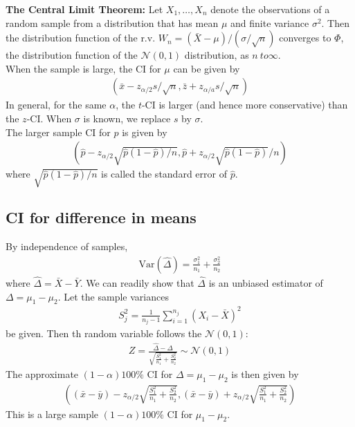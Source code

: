\documentclass{book}
\theoremstyle{definition}
\newcommand{\N}{\mathcal{N}}
\newcommand{\f}[2]{\frac{#1}{#2}}
\newcommand{\lp}{\left(}
\newcommand{\rp}{\right)}
\begin{document}
\noindent \textbf{The Central Limit Theorem:} Let $X_1,\dots,X_n$ denote the observations of a random sample from a distribution that has mean $\mu$ and finite variance $\sigma^2$. Then the distribution function of the r.v. $W_n = (\bar{X} - \mu)/(\sigma/\sqrt{n})$ converges to $\Phi$, the distribution function of the $\N(0,1)$ distribution, as $n\ to \infty$. \\


When the sample is large, the CI for $\mu$ can be given by
\begin{align}
\boxed{\lp \bar{x} - z_{\alpha/2}s/\sqrt{n}, \bar{z} + z_{\alpha/a}s/\sqrt{n} \rp}
\end{align}
In general, for the same $\alpha$, the $t$-CI is larger (and hence more conservative) than the $z$-CI. When $\sigma$ is known, we replace $s$ by $\sigma$. \\

The larger sample CI for $p$ is given by
\begin{align}
\boxed{\lp \hat{p} - z_{\alpha/2}\sqrt{\hat{p}(1-\hat{p})/n}, \hat{p}+ z_{\alpha/2}\sqrt{\hat{p}(1-\hat{p})}/n \rp}
\end{align} 
where $\sqrt{\hat{p}(1-\hat{p})/n}$ is called the standard error of $\hat{p}$. 



\subsection{CI for difference in means}

By independence of samples, 
\begin{align}
\text{Var}(\hat{\Delta}) = \f{\sigma_1^2}{n_1} + \f{\sigma^2_2}{n_2}
\end{align}
where $\hat{\Delta} = \bar{X} - \bar{Y}$. We can readily show that $\hat{\Delta}$ is an unbiased estimator of $\Delta = \mu_1 - \mu_2$. Let the sample variances
\begin{align}
S_j^2 = \f{1}{n_j - 1}\sum^{n_j}_{i=1}(X_i - \bar{X})^2
\end{align}
be given. Then th random variable follows the $\N(0,1)$:
\begin{align}
\boxed{Z = \f{\hat{\Delta} - \Delta}{\sqrt{\f{S_1^2}{n_1} + \f{S^2_2}{n_2}}} \sim \N(0,1)}
\end{align}
The approximate $(1-\alpha)100\%$ CI for $\Delta = \mu_1 - \mu_2$ is then given by
\begin{align}
\lp (\bar{x} - \bar{y}) - z_{\alpha/2}\sqrt{\f{S_1^2}{n_1} + \f{S^2_2}{n_2}}, 
(\bar{x} - \bar{y}) + z_{\alpha/2}\sqrt{\f{S_1^2}{n_1} + \f{S^2_2}{n_2}} \rp
\end{align}
This is a large sample $(1-\alpha)100\%$ CI for $\mu_1 - \mu_2$. \\
\end{document}
